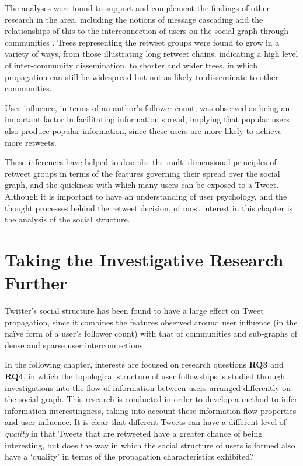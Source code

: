 The analyses were found to support and complement the findings of other research in the area, including the notions of message cascading \cite{galuba10} and the relationships of this to the interconnection of users on the social graph through communities \cite{java07}. Trees representing the retweet groups were found to grow in a variety of ways, from those illustrating long retweet chains, indicating a high level of inter-community dissemination, to shorter and wider trees, in which propagation can still be widespread but not as likely to disseminate to other communities.

User influence, in terms of an author's follower count, was observed as being an important factor in facilitating information spread, implying that popular users also produce popular information, since these users are more likely to achieve more retweets.

These inferences have helped to describe the multi-dimensional principles of retweet groups in terms of the features governing their spread over the social graph, and the quickness with which many users can be exposed to a Tweet. Although it is important to have an understanding of user psychology, and the thought processes behind the retweet decision, of most interest in this chapter is the analysis of the social structure.


\section{Taking the Investigative Research Further}
Twitter's social structure has been found to have a large effect on Tweet propagation, since it combines the features observed around user influence (in the na{\"i}ve form of a user's follower count) with that of communities and sub-graphs of dense and sparse user interconnections.

In the following chapter, interests are focused on research questions \textbf{RQ3} and \textbf{RQ4}, in which the topological structure of user followships is studied through investigations into the flow of information between users arranged differently on the social graph. This research is conducted in order to develop a method to infer information interestingness, taking into account these information flow properties and user influence. It is clear that different Tweets can have a different level of \textit{quality} in that Tweets that are retweeted have a greater chance of being interesting, but does the way in which the social structure of users is formed also have a `quality' in terms of the propagation characteristics exhibited?
